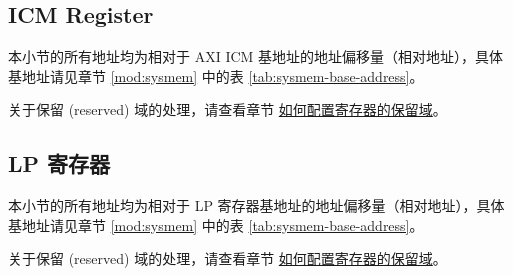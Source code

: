 \documentclass[main\_\_CN.tex]{subfiles}
\begin{document}


\newpage

\subsection{ICM Register}

本小节的所有地址均为相对于 AXI ICM 基地址的地址偏移量（相对地址），具体基地址请见章节 \ref{mod:sysmem} \textit{} 中的表 \ref{tab:sysmem-base-address}。

关于保留 (reserved) 域的处理，请查看章节 \hyperref[programming-reserved-field]{如何配置寄存器的保留域}。



\newpage
\subsection{LP 寄存器}

本小节的所有地址均为相对于 LP 寄存器基地址的地址偏移量（相对地址），具体基地址请见章节 \ref{mod:sysmem} \textit{} 中的表 \ref{tab:sysmem-base-address}。

关于保留 (reserved) 域的处理，请查看章节 \hyperref[programming-reserved-field]{如何配置寄存器的保留域}。


\end{document}
